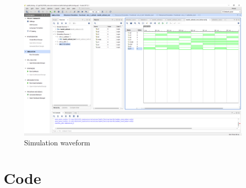 \documentclass[11pt]{article}
\newcommand{\Verilog}[2][]{%
	
}
\begin{document}
\begin{figure}[ht]\centering
	\includegraphics[width=1\textwidth,trim=18.5cm 15.75cm .5cm 4.5cm,clip]{lab1_example_screenshot.PNG}
	\caption{Simulation waveform}
	\label{fig:another_image}          %
\end{figure}


\section*{Code}

\Verilog[caption=File-included Verilog code example,label=code:file\_ex]{example\_code.sv}
\end{document}
